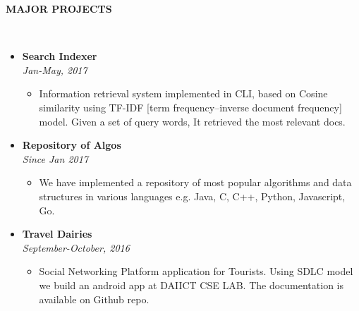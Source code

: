 \documentclass[a4paper,10pt]{article}
\newcommand{\isep}{-2 pt}
\newcommand{\lsep}{-0.5cm}
\newcommand{\resheading}[1]{{\small \colorbox{mygrey}{\begin{minipage}{0.975\textwidth}{\textbf{#1 \vphantom{p\^{E}}}}\end{minipage}}}}
\begin{document}
\resheading{\textbf{MAJOR PROJECTS} }\\[\lsep]
\begin{itemize}
\item \textbf{Search Indexer} \\
 \emph{ Jan-May, 2017
} \\[-0.6cm]
	\begin{itemize}\itemsep \isep
	\item Information retrieval system implemented in CLI, based on Cosine similarity using TF-IDF [term frequency–inverse document frequency] model. Given a set of 
query words, It retrieved the most relevant docs. 
	\end{itemize}

\item \noindent \textbf{Repository of Algos} \\
\emph{Since Jan 2017} \\[-0.6cm]
    \begin{itemize}\itemsep \isep
    	\item  We have implemented a repository of most popular algorithms and data structures in various languages e.g. Java, C, C++, Python, Javascript, Go. 
	\end{itemize}

\item \textbf{Travel Dairies} \\
 \emph{ September-October, 2016
} \\[-0.6cm]
\begin{itemize}\itemsep \isep
\item Social Networking Platform application for Tourists. Using SDLC model we build an 
android app at DAIICT CSE LAB. The documentation is available on Github repo. 
	\end{itemize}

\end{itemize}
\end{document}
